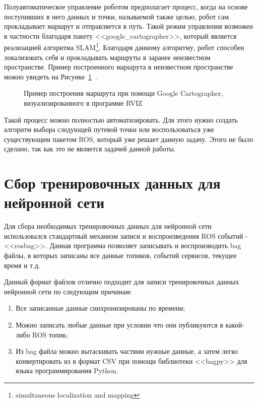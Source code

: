 Полуавтоматическое управление роботом предполагает процесс, когда на основе поступивших в него данных и точки, называемой также целью, робот сам прокладывает маршрут и отправляется в путь. Такой режим управления возможен в частности благодаря пакету <<google\_cartographer>>, который является реализацией алгоритма SLAM\footnote{simultaneous localization and mapping}. Благодаря данному алгоритму, робот способен локализовать себя и прокладывать маршруты в заранее неизвестном пространстве. Пример построенного маршрута в неизвестном пространстве можно увидеть на Рисунке~\cref{fig:path}~\cite{path}. 

\begin{figure}[ht]
    \caption{Пример построения маршрута при помощи Google Cartographer, визуализированного в программе RVIZ}\label{fig:path}
\end{figure}

Такой процесс можно полностью автоматизировать. Для этого нужно создать алгоритм выбора следующей путевой точки или воспользоваться уже существующим пакетом ROS, который уже решает данную задачу. Этого не было сделано, так как это не является задачей данной работы.

\section{Сбор тренировочных данных для нейронной сети}

Для сбора необходимых тренировочных данных для нейронной сети использовался стандартный механизм записи и воспроизведения ROS событий - <<rosbag>>. Данная программа позволяет записывать и воспроизводить bag файлы, в которых записаны все данные топиков, событий сервисов, текущее время и т.д. 

Данный формат файлов отлично подходит для записи тренировочных данных нейронной сети по следующим причинам:

\begin{enumerate}[beginpenalty=10000] %
  \item Все записанные данные синхронизированы по времени;
  \item Можно записать любые данные при условии что они публикуются в какой-либо ROS топик; 
  \item Из bag файла можно вытаскивать частями нужные данные, а затем легко конвертировать из в формат CSV при помощи библиотеки <<bagpy>> для языка программирования Python.
\end{enumerate}

